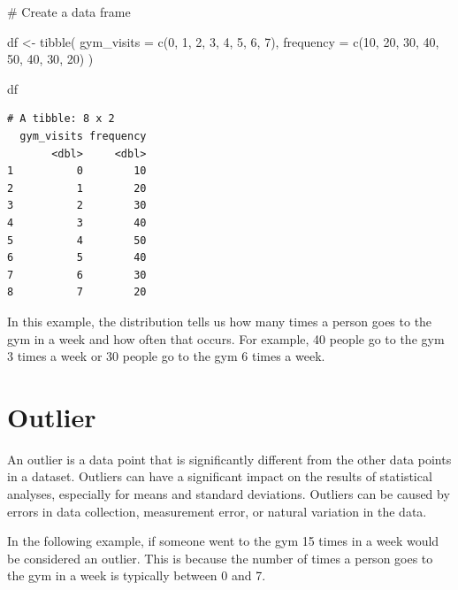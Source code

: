 \documentclass[
  letterpaper,
  DIV=11,
  numbers=noendperiod]{scrreprt}
\newenvironment{Shaded}{\begin{snugshade}}{\end{snugshade}}
\newcommand{\AttributeTok}[1]{\textcolor[rgb]{0.40,0.45,0.13}{#1}}
\newcommand{\CommentTok}[1]{\textcolor[rgb]{0.37,0.37,0.37}{#1}}
\newcommand{\DecValTok}[1]{\textcolor[rgb]{0.68,0.00,0.00}{#1}}
\newcommand{\FunctionTok}[1]{\textcolor[rgb]{0.28,0.35,0.67}{#1}}
\newcommand{\NormalTok}[1]{\textcolor[rgb]{0.00,0.23,0.31}{#1}}
\newcommand{\OtherTok}[1]{\textcolor[rgb]{0.00,0.23,0.31}{#1}}
\begin{document}
\begin{Shaded}
\begin{Highlighting}[]
\CommentTok{\# Create a data frame}

\NormalTok{df }\OtherTok{\textless{}{-}} \FunctionTok{tibble}\NormalTok{(}
  \AttributeTok{gym\_visits =} \FunctionTok{c}\NormalTok{(}\DecValTok{0}\NormalTok{, }\DecValTok{1}\NormalTok{, }\DecValTok{2}\NormalTok{, }\DecValTok{3}\NormalTok{, }\DecValTok{4}\NormalTok{, }\DecValTok{5}\NormalTok{, }\DecValTok{6}\NormalTok{, }\DecValTok{7}\NormalTok{),}
  \AttributeTok{frequency =} \FunctionTok{c}\NormalTok{(}\DecValTok{10}\NormalTok{, }\DecValTok{20}\NormalTok{, }\DecValTok{30}\NormalTok{, }\DecValTok{40}\NormalTok{, }\DecValTok{50}\NormalTok{, }\DecValTok{40}\NormalTok{, }\DecValTok{30}\NormalTok{, }\DecValTok{20}\NormalTok{)}
\NormalTok{)}

\NormalTok{df}
\end{Highlighting}
\end{Shaded}

\begin{verbatim}
# A tibble: 8 x 2
  gym_visits frequency
       <dbl>     <dbl>
1          0        10
2          1        20
3          2        30
4          3        40
5          4        50
6          5        40
7          6        30
8          7        20
\end{verbatim}

In this example, the distribution tells us how many times a person goes
to the gym in a week and how often that occurs. For example, 40 people
go to the gym 3 times a week or 30 people go to the gym 6 times a week.

\section*{Outlier}\label{outlier}


An outlier is a data point that is significantly different from the
other data points in a dataset. Outliers can have a significant impact
on the results of statistical analyses, especially for means and
standard deviations. Outliers can be caused by errors in data
collection, measurement error, or natural variation in the data.

In the following example, if someone went to the gym 15 times in a week
would be considered an outlier. This is because the number of times a
person goes to the gym in a week is typically between 0 and 7.
\end{document}
